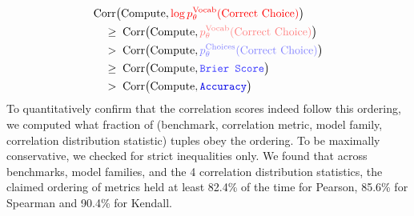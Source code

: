 %
\begin{align*}
    &\text{Corr}\big(\text{Compute}, \textcolor{red}{\log p_{\theta}^{\text{Vocab}}(\text{Correct Choice})} \big) \\
    &\quad \geq \; \text{Corr}\big(\text{Compute}, \textcolor{red!50!white}{p_{\theta}^{\text{Vocab}}(\text{Correct Choice})}\big)\\
    &\quad  > \; \text{Corr}\big(\text{Compute}, \textcolor{blue!50!white}{p_{\theta}^{\text{Choices}}(\text{Correct Choice})}\big)\\
    &\quad \geq \; \text{Corr}\big(\text{Compute}, \textcolor{blue!75!white}{\texttt{Brier Score}}\big)\\
    &\quad  > \; \text{Corr}\big(\text{Compute}, \textcolor{blue!90!black}{\texttt{Accuracy}}\big)\\
\end{align*}
%
To quantitatively confirm that the correlation scores indeed follow this ordering, we computed what fraction of (benchmark, correlation metric, model family, correlation distribution statistic) tuples obey the ordering. To be maximally conservative, we checked for strict inequalities only. We found that across benchmarks, model families, and the 4 correlation distribution statistics, the claimed ordering of metrics held at least 82.4\% of the time for Pearson, 85.6\% for Spearman and 90.4\% for Kendall.

